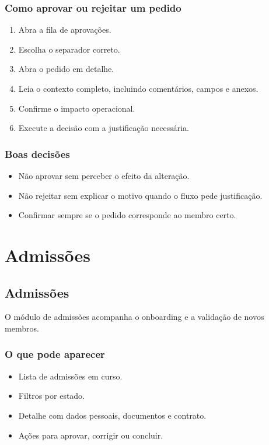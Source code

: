 \subsection{Como aprovar ou rejeitar um pedido}
\begin{enumerate}
  \item Abra a fila de aprovações.
  \item Escolha o separador correto.
  \item Abra o pedido em detalhe.
  \item Leia o contexto completo, incluindo comentários, campos e anexos.
  \item Confirme o impacto operacional.
  \item Execute a decisão com a justificação necessária.
\end{enumerate}

\subsection{Boas decisões}
\begin{itemize}
  \item Não aprovar sem perceber o efeito da alteração.
  \item Não rejeitar sem explicar o motivo quando o fluxo pede justificação.
  \item Confirmar sempre se o pedido corresponde ao membro certo.
\end{itemize}

\chapter{Admissões}
\section{Admissões}
O módulo de admissões acompanha o onboarding e a validação de novos membros.

\subsection{O que pode aparecer}
\begin{itemize}
  \item Lista de admissões em curso.
  \item Filtros por estado.
  \item Detalhe com dados pessoais, documentos e contrato.
  \item Ações para aprovar, corrigir ou concluir.
\end{itemize}


